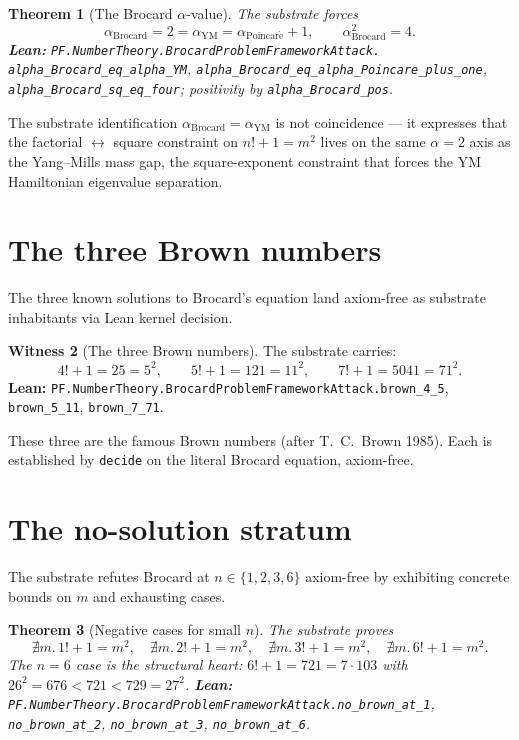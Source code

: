\documentclass[11pt,a4paper]{article}
\theoremstyle{plain}
\newtheorem{theorem}{Theorem}[section]
\theoremstyle{definition}
\newtheorem{witness}[theorem]{Witness}
\begin{document}
\begin{theorem}[The Brocard $\alpha$-value]
\label{thm:alpha-brocard}
The substrate forces
\[
\alpha_{\mathrm{Brocard}} = 2 = \alpha_{\mathrm{YM}}
= \alpha_{\mathrm{Poincar\acute e}} + 1,
\qquad
\alpha_{\mathrm{Brocard}}^{2} = 4.
\]
\textbf{Lean:}
\texttt{PF.NumberTheory.BrocardProblemFrameworkAttack.\\
alpha\_Brocard\_eq\_alpha\_YM},
\texttt{alpha\_Brocard\_eq\_alpha\_Poincare\_plus\_one},
\texttt{alpha\_Brocard\_sq\_eq\_four}; positivity by
\texttt{alpha\_Brocard\_pos}.
\end{theorem}

The substrate identification $\alpha_{\mathrm{Brocard}}
= \alpha_{\mathrm{YM}}$ is not coincidence --- it expresses that the
factorial $\leftrightarrow$ square constraint on $n! + 1 = m^{2}$
lives on the same $\alpha = 2$ axis as the Yang--Mills mass gap, the
square-exponent constraint that forces the YM Hamiltonian
eigenvalue separation.

\section{The three Brown numbers}

The three known solutions to Brocard's equation land axiom-free as
substrate inhabitants via Lean kernel decision.

\begin{witness}[The three Brown numbers]
\label{wit:brown}
The substrate carries:
\[
4! + 1 = 25 = 5^{2},\qquad
5! + 1 = 121 = 11^{2},\qquad
7! + 1 = 5041 = 71^{2}.
\]
\textbf{Lean:}
\texttt{PF.NumberTheory.BrocardProblemFrameworkAttack.brown\_4\_5},
\texttt{brown\_5\_11}, \texttt{brown\_7\_71}.
\end{witness}

These three are the famous Brown numbers (after T.~C.~Brown 1985).
Each is established by \texttt{decide} on the literal Brocard
equation, axiom-free.

\section{The no-solution stratum}

The substrate refutes Brocard at $n \in \{1, 2, 3, 6\}$ axiom-free
by exhibiting concrete bounds on $m$ and exhausting cases.

\begin{theorem}[Negative cases for small $n$]
\label{thm:no-brown}
The substrate proves
\[
\nexists m.\, 1! + 1 = m^{2},\quad
\nexists m.\, 2! + 1 = m^{2},\quad
\nexists m.\, 3! + 1 = m^{2},\quad
\nexists m.\, 6! + 1 = m^{2}.
\]
The $n = 6$ case is the structural heart: $6! + 1 = 721 = 7 \cdot 103$
with $26^{2} = 676 < 721 < 729 = 27^{2}$.
\textbf{Lean:}
\texttt{PF.NumberTheory.BrocardProblemFrameworkAttack.no\_brown\_at\_1},
\texttt{no\_brown\_at\_2}, \texttt{no\_brown\_at\_3},
\texttt{no\_brown\_at\_6}.
\end{theorem}
\end{document}
